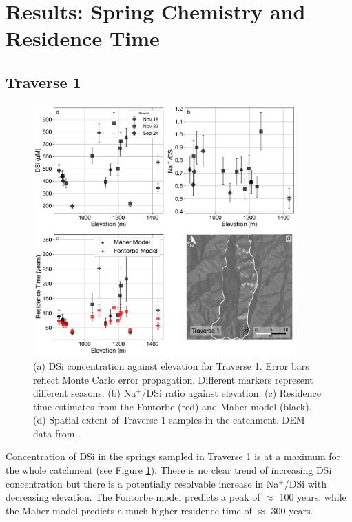 
\section{Results: Spring Chemistry and Residence Time}

\subsection{Traverse 1}

\begin{figure}[h]
    \centering
        \includegraphics[width=0.9\textwidth]{Traverse_1_summary.pdf}
    \caption{(a) DSi concentration against elevation for Traverse 1. Error bars reflect Monte Carlo error propagation. Different markers represent different seasons. (b) Na$^+$/DSi ratio against elevation. (c) Residence time estimates from the Fontorbe (red) and Maher model (black). (d) Spatial extent of Traverse 1 samples in the catchment. DEM data from \textcite{asterGlobalDigitalElevation2018}.}
    \label{fig:trav1}
\end{figure}

\FloatBarrier

Concentration of DSi in the springs sampled in Traverse 1 is at a maximum for the whole catchment (see Figure \ref{fig:trav1}). There is no clear trend of increasing DSi concentration but there is a potentially resolvable increase in Na$^+$/DSi with decreasing elevation. The Fontorbe model predicts a peak of $\approx$ 100 years, while the Maher model predicts a much higher residence time of $\approx$ 300 years. 




